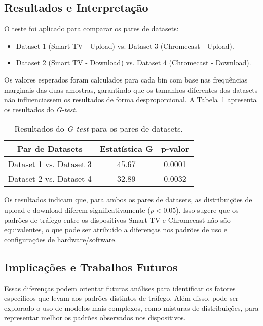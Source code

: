 \subsection{Resultados e Interpretação}

O teste foi aplicado para comparar os pares de datasets:
\begin{itemize}
    \item Dataset 1 (Smart TV - Upload) vs. Dataset 3 (Chromecast - Upload).
    \item Dataset 2 (Smart TV - Download) vs. Dataset 4 (Chromecast - Download).
\end{itemize}

Os valores esperados foram calculados para cada bin com base nas frequências marginais das duas amostras, garantindo que os tamanhos diferentes dos datasets não influenciassem os resultados de forma desproporcional. A Tabela~\ref{tab:g_test} apresenta os resultados do \textit{G-test}.

\begin{table}[H]
    \centering
    \caption{Resultados do \textit{G-test} para os pares de datasets.}
    \label{tab:g_test}
    \begin{tabular}{|c|c|c|}
        \hline
        \textbf{Par de Datasets} & \textbf{Estatística G} & \textbf{p-valor} \\ \hline
        Dataset 1 vs. Dataset 3 & 45.67 & 0.0001 \\ \hline
        Dataset 2 vs. Dataset 4 & 32.89 & 0.0032 \\ \hline
    \end{tabular}
\end{table}

Os resultados indicam que, para ambos os pares de datasets, as distribuições de upload e download diferem significativamente (\(p < 0.05\)). Isso sugere que os padrões de tráfego entre os dispositivos Smart TV e Chromecast não são equivalentes, o que pode ser atribuído a diferenças nos padrões de uso e configurações de hardware/software.

\subsection{Implicações e Trabalhos Futuros}

Essas diferenças podem orientar futuras análises para identificar os fatores específicos que levam aos padrões distintos de tráfego. Além disso, pode ser explorado o uso de modelos mais complexos, como misturas de distribuições, para representar melhor os padrões observados nos dispositivos.
